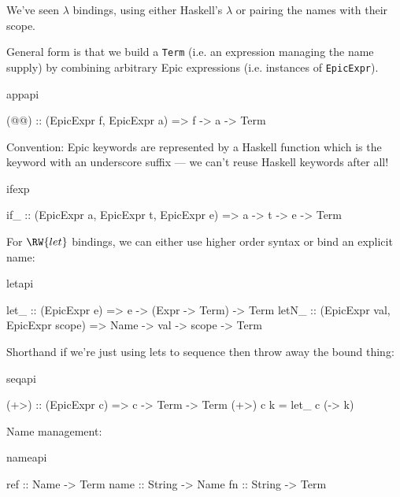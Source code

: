 We've seen $\lambda$ bindings, using either Haskell's $\lambda$ or
pairing the names with their scope.

General form is that we build a \texttt{Term} (i.e. an expression
managing the name supply) by combining arbitrary Epic expressions
(i.e. instances of \texttt{EpicExpr}).

\begin{SaveVerbatim}{appapi}

(@@) :: (EpicExpr f, EpicExpr a) => f -> a -> Term

\end{SaveVerbatim}

Convention: Epic keywords are represented by a Haskell function which
is the keyword with an underscore suffix --- we can't reuse Haskell
keywords after all!

\begin{SaveVerbatim}{ifexp}

if_ :: (EpicExpr a, EpicExpr t, EpicExpr e) =>
       a -> t -> e -> Term

\end{SaveVerbatim}

For $\RW{let}$ bindings, we can either use higher order syntax or bind
an explicit name:

\begin{SaveVerbatim}{letapi}

let_  :: (EpicExpr e) => 
         e -> (Expr -> Term) -> Term
letN_ :: (EpicExpr val, EpicExpr scope) =>
         Name -> val -> scope -> Term

\end{SaveVerbatim}

Shorthand if we're just using lets to sequence then throw away the
bound thing:

\begin{SaveVerbatim}{seqapi}

(+>) :: (EpicExpr c) => c -> Term -> Term
(+>) c k = let_ c (\x -> k)

\end{SaveVerbatim}

Name management:

\begin{SaveVerbatim}{nameapi}

ref  :: Name -> Term
name :: String -> Name
fn   :: String -> Term

\end{SaveVerbatim}

